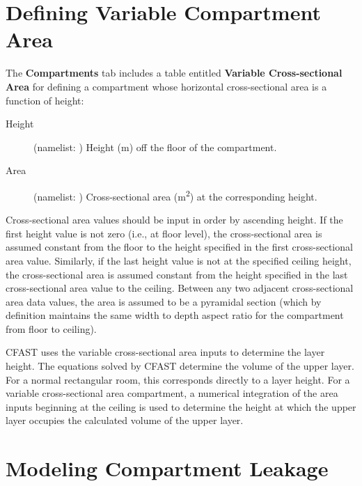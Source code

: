 \section{Defining Variable Compartment Area}
\label{info:COMP4}

The \textbf{Compartments} tab includes a table entitled \textbf{Variable Cross-sectional Area} for defining a compartment whose horizontal cross-sectional area is a function of height:
\begin{description}
\item[Height] (namelist: ) Height (m) off the floor of the compartment.
\item[Area] (namelist: ) Cross-sectional area (\unit{m^2}) at the corresponding height.
\end{description}
Cross-sectional area values should be input in order by ascending height. If the first height value is not zero (i.e., at floor level), the cross-sectional area is assumed constant from the floor to the height specified in the first cross-sectional area value. Similarly, if the last height value is not at the specified ceiling height, the cross-sectional area is assumed constant from the height specified in the last cross-sectional area value to the ceiling. Between any two adjacent cross-sectional area data values, the area is assumed to be a pyramidal section (which by definition maintains the same width to depth aspect ratio for the compartment from floor to ceiling).

CFAST uses the variable cross-sectional area inputs to determine the layer height. The equations solved by CFAST determine the volume of the upper layer. For a normal rectangular room, this corresponds directly to a layer height. For a variable cross-sectional area compartment, a numerical integration of the area inputs beginning at the ceiling is used to determine the height at which the upper layer occupies the calculated volume of the upper layer.




\section{Modeling Compartment Leakage}
\label{info:COMP5}

